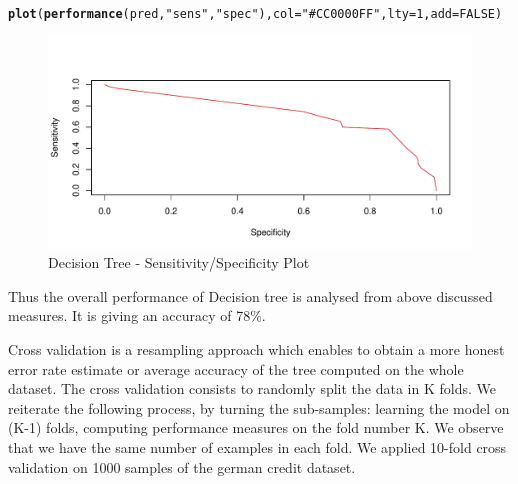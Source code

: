 \documentclass{article}\usepackage[]{graphicx}\usepackage[]{color}
\makeatletter
\def\maxwidth{ %
  \ifdim\Gin@nat@width>\linewidth
    \linewidth
  \else
    \Gin@nat@width
  \fi
}
\newcommand{\hlnum}[1]{\textcolor[rgb]{0.686,0.059,0.569}{#1}}%
\newcommand{\hlstr}[1]{\textcolor[rgb]{0.192,0.494,0.8}{#1}}%
\newcommand{\hlstd}[1]{\textcolor[rgb]{0.345,0.345,0.345}{#1}}%
\newcommand{\hlkwc}[1]{\textcolor[rgb]{0.333,0.667,0.333}{#1}}%
\newcommand{\hlkwd}[1]{\textcolor[rgb]{0.737,0.353,0.396}{\textbf{#1}}}%
\newenvironment{kframe}{%
 \def\at@end@of@kframe{}%
 \ifinner\ifhmode%
  \def\at@end@of@kframe{\end{minipage}}%
  \begin{minipage}{\columnwidth}%
 \fi\fi%
 \def\FrameCommand##1{\hskip\@totalleftmargin \hskip-\fboxsep
 \colorbox{shadecolor}{##1}\hskip-\fboxsep
     \hskip-\linewidth \hskip-\@totalleftmargin \hskip\columnwidth}%
 \MakeFramed {\advance\hsize-\width
   \@totalleftmargin\z@ \linewidth\hsize
   \@setminipage}}%
 {\par\unskip\endMakeFramed%
 \at@end@of@kframe}
\newenvironment{knitrout}{}{} %
\makeatother
\begin{document}
\begin{knitrout}
\color{fgcolor}\begin{kframe}
\begin{alltt}
\hlkwd{plot}\hlstd{(}\hlkwd{performance}\hlstd{(pred,} \hlstr{"sens"}\hlstd{,} \hlstr{"spec"}\hlstd{),} \hlkwc{col}\hlstd{=}\hlstr{"#CC0000FF"}\hlstd{,} \hlkwc{lty}\hlstd{=}\hlnum{1}\hlstd{,} \hlkwc{add}\hlstd{=}\hlnum{FALSE}\hlstd{)}
\end{alltt}
\end{kframe}\begin{figure}
\includegraphics[width=\maxwidth]{figure/unnamed-chunk-46-1} \caption[Decision Tree - Sensitivity/Specificity Plot]{Decision Tree - Sensitivity/Specificity Plot}\label{fig:unnamed-chunk-46}
\end{figure}


\end{knitrout}
Thus the overall performance of Decision tree is analysed from above discussed measures. It is giving an accuracy of 78\%.\par
Cross validation is a resampling approach which enables to obtain a more honest error rate estimate or average accuracy of the tree computed on the whole dataset. The cross validation consists to randomly split the data in K folds. We reiterate the following process, by turning the sub-samples: learning the model on (K-1) folds, computing performance measures on the fold number K. We observe that we have the same number of examples in each fold. We applied 10-fold cross validation on 1000 samples of the german credit dataset.
\end{document}
